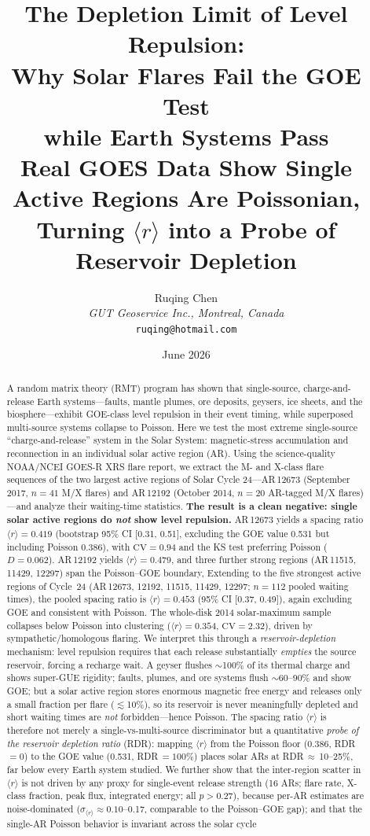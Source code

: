 \documentclass[12pt,a4paper]{article}
\title{\textbf{The Depletion Limit of Level Repulsion:\\
Why Solar Flares Fail the GOE Test\\
while Earth Systems Pass}\\[4pt]
\large Real GOES Data Show Single Active Regions Are Poissonian,\\
Turning $\langle r\rangle$ into a Probe of Reservoir Depletion}
\author{Ruqing Chen\\
\textit{GUT Geoservice Inc., Montreal, Canada}\\
\texttt{ruqing@hotmail.com}}
\date{June 2026}
\begin{document}
\maketitle

\begin{abstract}
A random matrix theory (RMT) program has shown that single-source, charge-and-release Earth systems---faults, mantle plumes, ore deposits, geysers, ice sheets, and the biosphere---exhibit GOE-class level repulsion in their event timing, while superposed multi-source systems collapse to Poisson. Here we test the most extreme single-source ``charge-and-release'' system in the Solar System: magnetic-stress accumulation and reconnection in an individual solar active region (AR). Using the science-quality NOAA/NCEI GOES-R XRS flare report, we extract the M- and X-class flare sequences of the two largest active regions of Solar Cycle 24---AR\,12673 (September 2017, $n=41$ M/X flares) and AR\,12192 (October 2014, $n=20$ AR-tagged M/X flares)---and analyze their waiting-time statistics. \textbf{The result is a clean negative: single solar active regions do \emph{not} show level repulsion.} AR\,12673 yields a spacing ratio $\langle r\rangle=0.419$ (bootstrap 95\% CI [0.31, 0.51], excluding the GOE value 0.531 but including Poisson 0.386), with $\mathrm{CV}=0.94$ and the KS test preferring Poisson ($D=0.062$). AR\,12192 yields $\langle r\rangle=0.479$, and three further strong regions (AR\,11515, 11429, 12297) span the Poisson--GOE boundary, Extending to the five strongest active regions of Cycle~24 (AR\,12673, 12192, 11515, 11429, 12297; $n=112$ pooled waiting times), the pooled spacing ratio is $\langle r\rangle=0.453$ (95\% CI [0.37, 0.49]), again excluding GOE and consistent with Poisson. The whole-disk 2014 solar-maximum sample collapses below Poisson into clustering ($\langle r\rangle=0.354$, $\mathrm{CV}=2.32$), driven by sympathetic/homologous flaring. We interpret this through a \emph{reservoir-depletion} mechanism: level repulsion requires that each release substantially \emph{empties} the source reservoir, forcing a recharge wait. A geyser flushes $\sim$100\% of its thermal charge and shows super-GUE rigidity; faults, plumes, and ore systems flush $\sim$60--90\% and show GOE; but a solar active region stores enormous magnetic free energy and releases only a small fraction per flare ($\lesssim$10\%), so its reservoir is never meaningfully depleted and short waiting times are \emph{not} forbidden---hence Poisson. The spacing ratio $\langle r\rangle$ is therefore not merely a single-vs-multi-source discriminator but a quantitative \emph{probe of the reservoir depletion ratio} (RDR): mapping $\langle r\rangle$ from the Poisson floor (0.386, RDR\,$=0$) to the GOE value (0.531, RDR\,$=100\%$) places solar ARs at RDR\,$\approx$\,10--25\%, far below every Earth system studied. We further show that the inter-region scatter in $\langle r\rangle$ is not driven by any proxy for single-event release strength (16 ARs; flare rate, X-class fraction, peak flux, integrated energy; all $p>0.27$), because per-AR estimates are noise-dominated ($\sigma_{\langle r\rangle}\approx0.10$--0.17, comparable to the Poisson--GOE gap); and that the single-AR Poisson behavior is invariant across the solar cycle 
\end{abstract}
\end{document}
